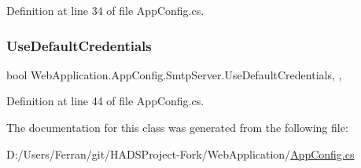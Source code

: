 Definition at line 34 of file App\+Config.\+cs.

\mbox{\label{classWebApplication_1_1AppConfig_1_1SmtpServer_a12805019c21ec023c97a6bdc2c3b9273}} 
\subsubsection{\texorpdfstring{UseDefaultCredentials}{UseDefaultCredentials}}
{\footnotesize\ttfamily bool Web\+Application.\+App\+Config.\+Smtp\+Server.\+Use\+Default\+Credentials\hspace{0.3cm}{\ttfamily [static]}, {\ttfamily [get]}, {\ttfamily [set]}}







Definition at line 44 of file App\+Config.\+cs.



The documentation for this class was generated from the following file\+:\begin{DoxyCompactItemize}
\item 
D\+:/\+Users/\+Ferran/git/\+H\+A\+D\+S\+Project-\/\+Fork/\+Web\+Application/\mbox{\hyperlink{AppConfig_8cs}{App\+Config.\+cs}}\end{DoxyCompactItemize}
